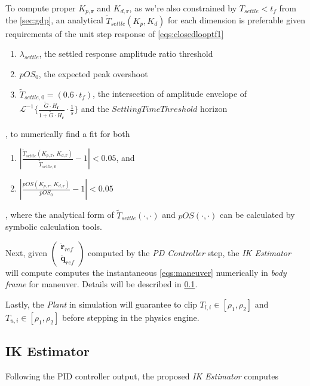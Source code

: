 \documentclass[10pt]{elsarticle}
\begin{document}
To compute proper $K_{p, \boldsymbol{r}}$ and $K_{d, \boldsymbol{r}}$, as we're also constrained by 
$T_{settle} < t_f$ from the \cref{sec:gdp}, an analytical $\tilde{T}_{settle}(K_p, K_d)$ for each dimension is preferable given requirements of the unit step response of \eqref{eqs:closedlooptf1} 
\begin{enumerate}[label=\textbf{c.\arabic*}, itemsep=2pt]
    \item \label{eqs:setrange} $\lambda_{settle}$, the settled response amplitude ratio threshold       
    \item \label{eqs:pOS} $pOS_{0}$, the expected peak overshoot
    \item \label{eqs:Tsettle} $\tilde{T}_{settle, 0} = (0.6 \cdot t_f)$, the intersection of amplitude envelope of $\mathcal{L}^{-1}\{\frac{\tilde{G} \cdot H_{\boldsymbol{r}}}{1 + \tilde{G} \cdot H_{\boldsymbol{r}}} \cdot \frac{1}{s}\}$ and the $SettlingTimeThreshold$ horizon
\end{enumerate}
, to numerically find a fit for both
\begin{enumerate}[label=\textbf{d.\arabic*}, itemsep=2pt]
    \item $|\frac{\tilde{T}_{settle}(K_{p,\boldsymbol{r}}, \, K_{d,\boldsymbol{r}})}{\tilde{T}_{settle, 0}} - 1| < 0.05$, and
    \item $|\frac{pOS(K_{p,\boldsymbol{r}}, \, K_{d,\boldsymbol{r}})}{pOS_{0}} - 1| < 0.05$
\end{enumerate}
, where the analytical form of $\tilde{T}_{settle}(\cdot, \cdot)$ and $pOS(\cdot, \cdot)$ can be calculated by symbolic calculation tools. 

Next, given $\begin{pmatrix} \ddot{\boldsymbol{r}}_{ref} \\ \ddot{\boldsymbol{q}}_{ref} \end{pmatrix}$ computed by the \textit{PD Controller} step, the \textit{IK Estimator} will compute computes the instantaneous \eqref{eqs:maneuver} numerically in \textit{body frame} for maneuver. Details will be described in \cref{sec:ikestimator}. 

Lastly, the \textit{Plant} in simulation will guarantee to clip $T_{l,i} \in [\rho_1, \rho_2]$ and $T_{u,i} \in [\rho_1, \rho_2]$ before stepping in the physics engine.

\subsection{IK Estimator} \label{sec:ikestimator}
Following the PID controller output, the proposed \textit{IK Estimator} computes    
\end{document}
